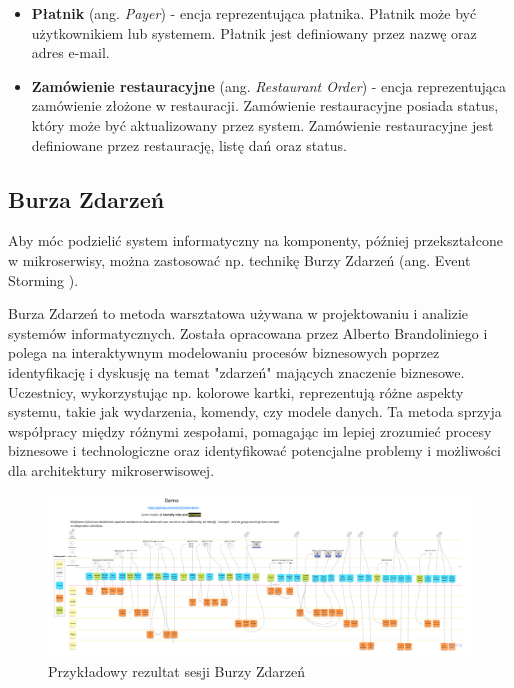\begin{itemize}
    \item \textbf{Płatnik} (ang. \textit{Payer}) - encja reprezentująca płatnika. Płatnik może być użytkownikiem lub systemem. Płatnik jest definiowany przez nazwę oraz adres e-mail.
    \item \textbf{Zamówienie restauracyjne} (ang. \textit{Restaurant Order}) - encja reprezentująca zamówienie złożone w restauracji. Zamówienie restauracyjne posiada status, który może być aktualizowany przez system. Zamówienie restauracyjne jest definiowane przez restaurację, listę dań oraz status.

\end{itemize}

\subsection{Burza Zdarzeń}

Aby móc podzielić system informatyczny na komponenty, później przekształcone w mikroserwisy, można zastosować np. technikę Burzy Zdarzeń (ang. Event Storming \cite{eventstorming}).

Burza Zdarzeń to metoda warsztatowa używana w projektowaniu i analizie systemów informatycznych. Została opracowana przez Alberto Brandoliniego i polega na interaktywnym modelowaniu procesów biznesowych poprzez identyfikację i dyskusję na temat "zdarzeń" mających znaczenie biznesowe. Uczestnicy, wykorzystując np. kolorowe kartki, reprezentują różne aspekty systemu, takie jak wydarzenia, komendy, czy modele danych. Ta metoda sprzyja współpracy między różnymi zespołami, pomagając im lepiej zrozumieć procesy biznesowe i technologiczne oraz identyfikować potencjalne problemy i możliwości dla architektury mikroserwisowej.

\begin{figure}[!h]
    \centering \includegraphics[width=1.0\linewidth]{event_storming.png}
    \caption{Przykładowy rezultat sesji Burzy Zdarzeń \cite{event_storming_rys}}
\end{figure}



